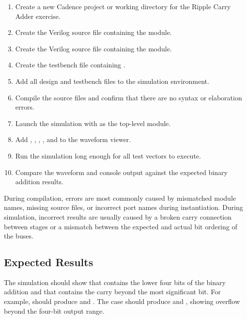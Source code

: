 \begin{enumerate}
    \item Create a new Cadence project or working directory for the Ripple Carry Adder exercise.
    \item Create the Verilog source file containing the  module.
    \item Create the Verilog source file containing the  module.
    \item Create the testbench file containing .
    \item Add all design and testbench files to the simulation environment.
    \item Compile the source files and confirm that there are no syntax or elaboration errors.
    \item Launch the simulation with  as the top-level module.
    \item Add , , , , and
     to the waveform viewer.
    \item Run the simulation long enough for all test vectors to execute.
    \item Compare the waveform and console output against the expected binary addition results.
\end{enumerate}


\noindent During compilation, errors are most commonly caused by mismatched module names, missing
source files, or incorrect port names during instantiation. During simulation, incorrect results are
usually caused by a broken carry connection between stages or a mismatch between the expected and
actual bit ordering of the buses.

\subsection{Expected Results}
The simulation should show that  contains the lower four bits of the binary
addition and that  contains the carry beyond the most significant bit. For example,
 should produce  and . The
case  should produce  and ,
showing overflow beyond the four-bit output range.\\

